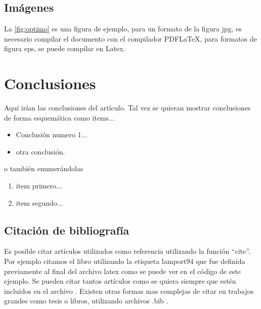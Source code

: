 \documentclass[a4paper,openright,12pt]{report}
\begin{document}
\subsection{Imágenes}
%
La \autoref{fig:optimo} es una figura de ejemplo, para un formato de la figura jpg, es necesario compilar el documento con el compilador PDFLaTeX, para formatos de figura eps, se puede compilar en Latex.
\begin{figure}[h!]
\centering
\label{fig:optimo}
\caption{}
\end{figure}

\section{Conclusiones}
%
Aquí irían las conclusiones del artículo.  Tal vez se quieran mostrar conclusiones de forma esquemática como items...
%
\begin{itemize}
  \item Conclusión numero 1... 
  \item otra conclusión.
\end{itemize}

o también enumerándolas

\begin{enumerate}
  \item item primero...
  \item item segundo...
\end{enumerate}


\subsection{Citación de bibliografía}
%
Es posible citar artículos utilizados como referencia utilizando la función ``cite''. Por ejemplo citamos el libro \cite{lamport94} utilizando la etiqueta lamport94 que fue definida previamente al final del archivo latex como se puede ver en el código de este ejemplo. %
%
Se pueden citar tantos artículos como se quiera siempre que estén incluidos en el archivo \cite{otraetiqueta}. Existen otras formas mas complejas de citar en trabajos grandes como tesis o libros, utilizando archivos .bib . %
\end{document}
